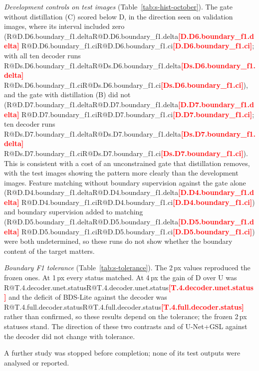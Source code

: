 \documentclass[10pt]{article}
\makeatletter
\newcommand{\R}[1]{\ifcsname R@#1\endcsname\csname R@#1\endcsname\else\textbf{\textcolor{red}{[#1]}}\fi}
\renewcommand\paragraph{\@startsection{paragraph}{4}{\z@}{1.6ex \@plus .5ex \@minus .2ex}{-1em}{\normalfont\normalsize\bfseries}}
\newcommand{\fitwidth}[1]{\sbox{\fitbox}{#1}\ifdim\wd\fitbox>\linewidth\resizebox{\linewidth}{!}{\usebox{\fitbox}}\else\usebox{\fitbox}\fi}
\makeatother
\begin{document}
\emph{Development controls on test images} (Table~\ref{tab:s-hist-october}). The gate without distillation (C) scored below D, in the direction seen on validation images, where its interval included zero (\R{D.D6.boundary_f1.delta} \R{D.D6.boundary_f1.ci}; with all ten decoder runs \R{Ds.D6.boundary_f1.delta} \R{Ds.D6.boundary_f1.ci}), and the gate with distillation (B) did not (\R{D.D7.boundary_f1.delta} \R{D.D7.boundary_f1.ci}; ten decoder runs \R{Ds.D7.boundary_f1.delta} \R{Ds.D7.boundary_f1.ci}). This is consistent with a cost of an unconstrained gate that distillation removes, with the test images showing the pattern more clearly than the development images. Feature matching without boundary supervision against the gate alone (\R{D.D4.boundary_f1.delta} \R{D.D4.boundary_f1.ci}) and boundary supervision added to matching (\R{D.D5.boundary_f1.delta} \R{D.D5.boundary_f1.ci}) were both undetermined, so these runs do not show whether the boundary content of the target matters.
\begin{table}[!htbp]\centering\scriptsize
\fitwidth{}
\caption{\label{tab:s-hist-october}Development controls re-evaluated post hoc on the official ISIC2018 test, three runs per arm, with 95\% intervals. Arms as in the development table above; decoder: the retrained arm D, seeds 1--3. Holm over the eight contrasts.}
\end{table}

\emph{Boundary F1 tolerance} (Table~\ref{tab:s-tolerance}). The 2\,px values reproduced the frozen ones. At 1\,px every status matched. At 4\,px the gain of D over U was \R{T.4.decoder.unet.status} and the deficit of BDS-Lite against the decoder was \R{T.4.full.decoder.status} rather than confirmed, so these results depend on the tolerance; the frozen 2\,px statuses stand. The direction of these two contrasts and of U-Net+GSL against the decoder did not change with tolerance.
\begin{table}[!htbp]\centering\small

\caption{\label{tab:s-tolerance}ISIC2018 official test, ten runs per arm: Boundary F1 differences at three matching tolerances, with the status by the frozen rule of the main text (confirmed: fresh seeds pass Holm with the same sign; supported: ten-run interval excludes zero). Post hoc except at 2\,px.}
\end{table}

\paragraph{Stopped study.} A further study was stopped before completion; none of its test outputs were analysed or reported.
\end{document}
